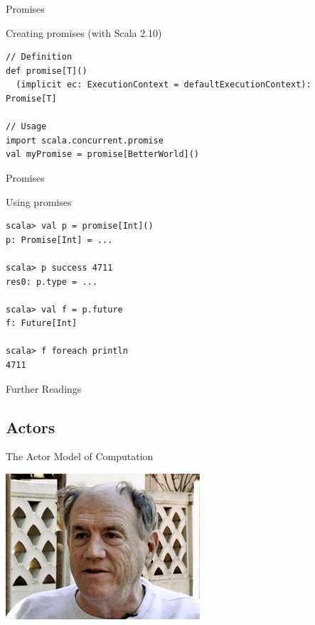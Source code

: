 \begin{frame}[fragile]{Promises}
\begin{block}{Creating promises (with Scala 2.10)}
\begin{lstlisting}
// Definition
def promise[T]()
  (implicit ec: ExecutionContext = defaultExecutionContext): Promise[T]
    
// Usage
import scala.concurrent.promise
val myPromise = promise[BetterWorld]()
\end{lstlisting}
\end{block}
\end{frame}

\begin{frame}[fragile]{Promises}
\begin{exampleblock}{Using promises}
\begin{lstlisting}
scala> val p = promise[Int]()
p: Promise[Int] = ...

scala> p success 4711
res0: p.type = ... 

scala> val f = p.future
f: Future[Int]

scala> f foreach println
4711
\end{lstlisting}
\end{exampleblock}
\end{frame}

\begin{frame}{Further Readings}
\begin{center}
\end{center}
\begin{center}
\end{center}
\begin{center}
\end{center}
\end{frame}

\subsection{Actors}
\begin{frame}{The Actor Model of Computation}
\begin{center}
\includegraphics{resources/CarlHewitt.png}
\end{center}
\end{frame}

